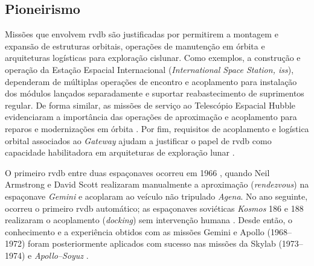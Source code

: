 

\subsection{Pioneirismo}

Missões que envolvem \gls{rvdb} são justificadas por permitirem a montagem e expansão de estruturas orbitais, operações de manutenção em órbita e arquiteturas logísticas para exploração cislunar.
Como exemplos, a construção e operação da Estação Espacial Internacional (\emph{International Space Station, \gls{iss}}), dependeram de múltiplas operações de encontro e acoplamento para instalação dos módulos lançados separadamente \cite{nasaRVDBiss} e suportar reabastecimento de suprimentos regular.
De forma similar, as missões de serviço ao Telescópio Espacial Hubble evidenciaram a importância das operações de aproximação e acoplamento para reparos e modernizações em órbita \cite{hubbleRVDB}.
Por fim, requisitos de acoplamento e logística orbital associados ao \emph{Gateway} ajudam a justificar o papel de \gls{rvdb} como capacidade habilitadora em arquiteturas de exploração lunar \cite{gatewayRVDB}.

O primeiro \gls{rvdb} entre duas espaçonaves ocorreu em 1966 \cite{nasa1stDocking}, quando Neil Armstrong e David Scott realizaram manualmente a aproximação (\emph{rendezvous}) na espaçonave \emph{Gemini} e acoplaram ao veículo não tripulado \emph{Agena}.
No ano seguinte, ocorreu o primeiro \gls{rvdb} automático; as espaçonaves soviéticas \emph{Kosmos} 186 e 188 realizaram o acoplamento (\emph{docking}) sem intervenção humana \cite{nasaAutmaticDocking1967}.
Desde então, o conhecimento e a experiência obtidos com as missões Gemini e Apollo (1968--1972) foram posteriormente aplicados com sucesso nas missões da Skylab (1973--1974) e \emph{Apollo--Soyuz} \cite{goodman2011rendezvous}.

